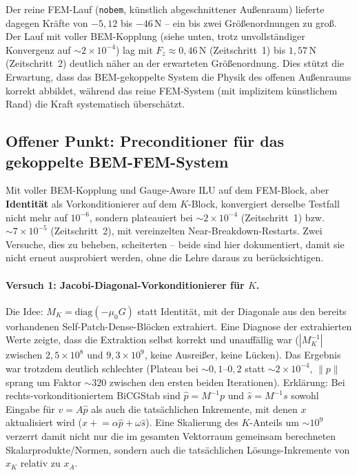 \documentclass[11pt,a4paper]{article}
\begin{document}
Der reine FEM-Lauf (\texttt{nobem}, künstlich abgeschnittener Außenraum) lieferte dagegen Kräfte von $-5{,}12$ bis $-46\,\mathrm{N}$ -- ein bis zwei Größenordnungen zu groß. Der Lauf mit voller BEM-Kopplung (siehe unten, trotz unvollständiger Konvergenz auf $\sim 2\times 10^{-4}$) lag mit $F_z \approx 0{,}46\,\mathrm{N}$ (Zeitschritt~1) bis $1{,}57\,\mathrm{N}$ (Zeitschritt~2) deutlich näher an der erwarteten Größenordnung. Dies stützt die Erwartung, dass das BEM-gekoppelte System die Physik des offenen Außenraums korrekt abbildet, während das reine FEM-System (mit implizitem künstlichem Rand) die Kraft systematisch überschätzt.

\subsection{Offener Punkt: Preconditioner für das gekoppelte BEM-FEM-System}
\label{sec:bem-precond-offen}

Mit voller BEM-Kopplung und Gauge-Aware ILU auf dem FEM-Block, aber \textbf{Identität} als Vorkonditionierer auf dem $K$-Block, konvergiert derselbe Testfall nicht mehr auf $10^{-6}$, sondern plateauiert bei $\sim 2\times 10^{-4}$ (Zeitschritt~1) bzw.\ $\sim 7\times 10^{-5}$ (Zeitschritt~2), mit vereinzelten Near-Breakdown-Restarts. Zwei Versuche, dies zu beheben, scheiterten -- beide sind hier dokumentiert, damit sie nicht erneut ausprobiert werden, ohne die Lehre daraus zu berücksichtigen.

\paragraph{Versuch 1: Jacobi-Diagonal-Vorkonditionierer für $K$.} Die Idee: $M_K = \mathrm{diag}(-\mu_0 G)$ statt Identität, mit der Diagonale aus den bereits vorhandenen Self-Patch-Dense-Blöcken extrahiert. Eine Diagnose der extrahierten Werte zeigte, dass die Extraktion selbst korrekt und unauffällig war ($|M_K^{-1}|$ zwischen $2{,}5\times 10^8$ und $9{,}3\times 10^9$, keine Ausreißer, keine Lücken). Das Ergebnis war trotzdem deutlich schlechter (Plateau bei $\sim 0{,}1$--$0{,}2$ statt $\sim 2\times 10^{-4}$, $\|p\|$ sprang um Faktor $\sim 320$ zwischen den ersten beiden Iterationen). Erklärung: Bei rechts-vorkonditioniertem BiCGStab sind $\hat p = M^{-1}p$ und $\hat s = M^{-1}s$ sowohl Eingabe für $v = A\hat p$ als auch die tatsächlichen Inkremente, mit denen $x$ aktualisiert wird ($x \mathrel{+}= \alpha \hat p + \omega \hat s$). Eine Skalierung des $K$-Anteils um $\sim 10^9$ verzerrt damit nicht nur die im gesamten Vektorraum gemeinsam berechneten Skalarprodukte/Normen, sondern auch die tatsächlichen Lösungs-Inkremente von $x_K$ relativ zu $x_A$.
\end{document}
